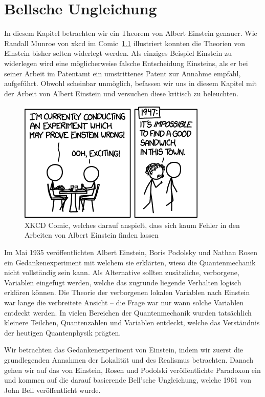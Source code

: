 \chapter{Bellsche Ungleichung\label{chapter:bell}}
\begin{refsection}

In diesem Kapitel betrachten wir ein Theorem von Albert Einstein genauer.
Wie Randall Munroe von xkcd im
Comic~\ref{fig:bell:xkcd_einstein} illustriert konnten die Theorien von
Einstein bisher selten widerlegt werden.
Als einziges Beispiel Einstein zu widerlegen wird eine m\"oglicherweise falsche
Entscheidung Einsteins, als er bei seiner Arbeit im Patentamt ein umstrittenes
Patent zur Annahme empfahl, aufgef\"uhrt.
Obwohl scheinbar unm\"oglich, befassen wir uns in diesem Kapitel mit der Arbeit
von Albert Einstein und versuchen diese kritisch zu beleuchten.

\begin{figure}[b]
    \centering
    \includegraphics[width=0.5\linewidth]{bell/images/xkcd_einstein.png}
    \caption{XKCD Comic, welches darauf anspielt, dass sich kaum Fehler 
    in den Arbeiten von Albert Einstein finden lassen \cite{Bell:XkcdEinstein}}
    \label{fig:bell:xkcd_einstein}
\end{figure}


Im Mai 1935 ver\"offentlichten Albert Einstein, Boris Podolsky und
Nathan Rosen ein Gedankenexperiment mit welchem sie erkl\"arten, wieso
die Quantenmechanik nicht vollst\"andig sein kann. Als Alternative
sollten zus\"atzliche, verborgene, Variablen eingef\"ugt werden, welche
das zugrunde liegende Verhalten logisch erkl\"aren k\"onnen.
Die Theorie der verborgenen lokalen Variablen nach Einstein war lange
die verbreitete Ansicht -- die Frage war nur wann solche Variablen
entdeckt werden. In vielen Bereichen der Quantenmechanik wurden tats\"achlich
kleinere Teilchen, Quantenzahlen und Variablen entdeckt, welche das
Verst\"andnis der heutigen Quantenphysik pr\"agten.

Wir betrachten das Gedankenexperiment von Einstein, indem wir zuerst die
grundlegenden Annahmen der Lokalit\"at und des Realismus betrachten. Danach
gehen wir auf das von Einstein, Rosen und Podolski ver\"offentlichte Paradoxon
ein und kommen auf die darauf basierende Bell'sche Ungleichung, welche
1961 von John Bell ver\"offentlicht wurde.


\end{refsection}
